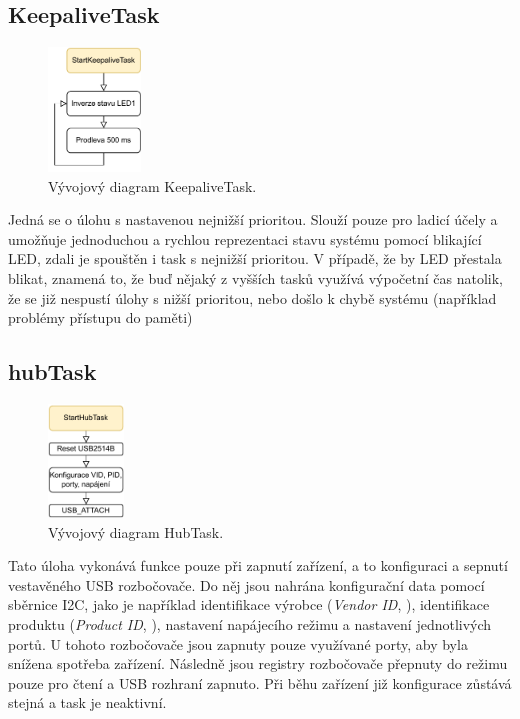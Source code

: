 \subsection{KeepaliveTask}
\begin{figure}[h]
    \centering
    \includegraphics[width=0.22\textwidth]{obrazky/KeepaliveTask}
    \caption{Vývojový diagram KeepaliveTask.}
\end{figure}
Jedná se o úlohu s nastavenou nejnižší prioritou. Slouží pouze pro ladicí účely a umožňuje jednoduchou a rychlou reprezentaci stavu systému pomocí blikající LED, zdali je spouštěn i task s nejnižší prioritou. V případě, že by LED přestala blikat, znamená to, že buď nějaký z vyšších tasků využívá výpočetní čas natolik, že se již nespustí úlohy s nižší prioritou, nebo došlo k chybě systému (například problémy přístupu do paměti)
\subsection{hubTask}
\begin{figure}[h]
    \centering
    \includegraphics[width=0.18\textwidth]{obrazky/HubTask}
    \caption{Vývojový diagram HubTask.}
\end{figure}
Tato úloha vykonává funkce pouze při zapnutí zařízení, a to konfiguraci a sepnutí vestavěného \ac{USB} rozbočovače. Do něj jsou nahrána konfigurační data pomocí sběrnice I2C, jako je například identifikace výrobce (\emph{Vendor ID}, ), identifikace produktu (\emph{Product ID}, ), nastavení napájecího režimu a nastavení jednotlivých portů. U tohoto rozbočovače jsou zapnuty pouze využívané porty, aby byla snížena spotřeba zařízení. Následně jsou registry rozbočovače přepnuty do režimu pouze pro čtení a \ac{USB} rozhraní zapnuto. Při běhu zařízení již konfigurace zůstává stejná a task je neaktivní.
